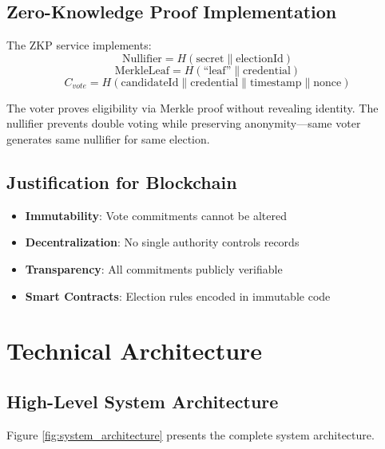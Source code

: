 \documentclass[conference]{IEEEtran}
\begin{document}
\subsection{Zero-Knowledge Proof Implementation}
The ZKP service implements:
\begin{equation}
\text{Nullifier} = H(\text{secret} \parallel \text{electionId})
\end{equation}
\begin{equation}
\text{MerkleLeaf} = H(\text{``leaf''} \parallel \text{credential})
\end{equation}
\begin{equation}
C_{vote} = H(\text{candidateId} \parallel \text{credential} \parallel \text{timestamp} \parallel \text{nonce})
\end{equation}

The voter proves eligibility via Merkle proof without revealing identity. The nullifier prevents double voting while preserving anonymity---same voter generates same nullifier for same election.

\subsection{Justification for Blockchain}
\begin{itemize}
    \item \textbf{Immutability}: Vote commitments cannot be altered
    \item \textbf{Decentralization}: No single authority controls records
    \item \textbf{Transparency}: All commitments publicly verifiable
    \item \textbf{Smart Contracts}: Election rules encoded in immutable code
\end{itemize}

\section{Technical Architecture}

\subsection{High-Level System Architecture}

Figure \ref{fig:system_architecture} presents the complete system architecture.
\end{document}
